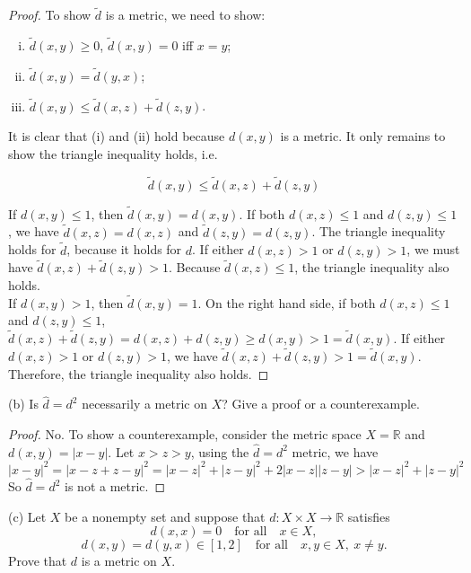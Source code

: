 \documentclass[11pt,a4paper]{amsart}
\def\R{{\mathbb R}}
\def\ra{\rightarrow}
\begin{document}
\begin{proof}
  To show $\tilde{d}$ is a metric, we need to show:
  \begin{enumerate}[(i)]
    \item $\tilde{d}(x,y) \geq 0$, $\tilde{d}(x,y)=0$ iff $x=y$;
    \item $\tilde{d}(x,y) = \tilde{d}(y,x)$;
    \item $\tilde{d}(x,y) \leq \tilde{d}(x,z) + \tilde{d}(z,y)$.
  \end{enumerate}
  It is clear that (i) and (ii) hold because $d(x,y)$ is a metric.
  It only remains to show the triangle inequality holds, i.e.

  $$ \tilde{d}(x,y) \leq \tilde{d}(x,z) + \tilde{d}(z,y) $$

  If $d(x,y) \leq 1$, then $\tilde{d}(x,y) = d(x,y)$.
  If both $d(x,z) \leq 1$ and $d(z,y) \leq 1$,  we have
  $\tilde{d}(x,z) = d(x,z)$ and $\tilde{d}(z,y) = d(z,y)$.
  The triangle inequality holds for $\tilde{d}$, because
  it holds for $d$. If either $d(x,z) > 1$ or $d(z,y) > 1$, we must have
  $\tilde{d}(x,z) + \tilde{d}(z,y) > 1$. Because $\tilde d(x,z) \leq 1$,
  the triangle inequality also holds. \\

  If $d(x,y) > 1$, then $\tilde{d}(x,y) = 1$. On the right hand side,
  if both $d(x,z) \leq 1$ and $d(z,y) \leq 1$,
  $\tilde d(x,z)+\tilde d(z,y) = d(x,z)+d(z,y) \geq d(x,y) > 1 = \tilde d(x,y)$.
  If either $d(x,z) > 1$ or $d(z,y) > 1$, we have
  $\tilde{d}(x,z) + \tilde{d}(z,y) > 1 = \tilde{d}(x,y)$.
  Therefore, the triangle inequality also holds.
\end{proof}

\medskip

(b) Is $\hat d=d^2$ necessarily a metric on $X$? Give a proof or a counterexample.

\begin{proof}
No. To show a counterexample, consider the metric space $X=\R$ and $d(x,y)=|x-y|$.
Let $x > z > y$, using the $\hat d=d^2$ metric, we have
$$ |x-y|^2 = |x-z + z-y|^2 = |x-z|^2 + |z-y|^2 + 2|x-z||z-y| > |x-z|^2 + |z-y|^2 $$
So $\hat d=d^2$ is not a metric.
\end{proof}

\medskip

(c) Let $X$ be a nonempty set and suppose that $d:X\times X\ra \R$
satisfies
$$ d(x,x)=0 \quad\mbox{for all} \quad x\in X, $$
$$ d(x,y)=d(y,x)\in [1,2] \quad\mbox{for all}\quad x,y\in X, \ x\neq y. $$
Prove that $d$ is a metric on $X$.
\end{document}

